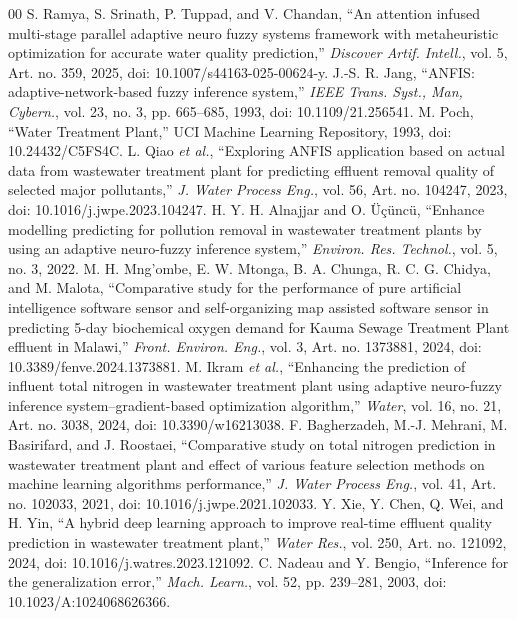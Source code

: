 \documentclass[conference]{IEEEtran}
\begin{document}
\begin{thebibliography}{00}
 S. Ramya, S. Srinath, P. Tuppad, and V. Chandan, ``An attention infused multi-stage parallel adaptive neuro fuzzy systems framework with metaheuristic optimization for accurate water quality prediction,'' \emph{Discover Artif. Intell.}, vol. 5, Art. no. 359, 2025, doi: 10.1007/s44163-025-00624-y.
 J.-S. R. Jang, ``ANFIS: adaptive-network-based fuzzy inference system,'' \emph{IEEE Trans. Syst., Man, Cybern.}, vol. 23, no. 3, pp. 665--685, 1993, doi: 10.1109/21.256541.
 M. Poch, ``Water Treatment Plant,'' UCI Machine Learning Repository, 1993, doi: 10.24432/C5FS4C.
 L. Qiao \emph{et al.}, ``Exploring ANFIS application based on actual data from wastewater treatment plant for predicting effluent removal quality of selected major pollutants,'' \emph{J. Water Process Eng.}, vol. 56, Art. no. 104247, 2023, doi: 10.1016/j.jwpe.2023.104247.
 H. Y. H. Alnajjar and O. \"U\c{c}\"unc\"u, ``Enhance modelling predicting for pollution removal in wastewater treatment plants by using an adaptive neuro-fuzzy inference system,'' \emph{Environ. Res. Technol.}, vol. 5, no. 3, 2022.
 M. H. Mng'ombe, E. W. Mtonga, B. A. Chunga, R. C. G. Chidya, and M. Malota, ``Comparative study for the performance of pure artificial intelligence software sensor and self-organizing map assisted software sensor in predicting 5-day biochemical oxygen demand for Kauma Sewage Treatment Plant effluent in Malawi,'' \emph{Front. Environ. Eng.}, vol. 3, Art. no. 1373881, 2024, doi: 10.3389/fenve.2024.1373881.
 M. Ikram \emph{et al.}, ``Enhancing the prediction of influent total nitrogen in wastewater treatment plant using adaptive neuro-fuzzy inference system--gradient-based optimization algorithm,'' \emph{Water}, vol. 16, no. 21, Art. no. 3038, 2024, doi: 10.3390/w16213038.
 F. Bagherzadeh, M.-J. Mehrani, M. Basirifard, and J. Roostaei, ``Comparative study on total nitrogen prediction in wastewater treatment plant and effect of various feature selection methods on machine learning algorithms performance,'' \emph{J. Water Process Eng.}, vol. 41, Art. no. 102033, 2021, doi: 10.1016/j.jwpe.2021.102033.
 Y. Xie, Y. Chen, Q. Wei, and H. Yin, ``A hybrid deep learning approach to improve real-time effluent quality prediction in wastewater treatment plant,'' \emph{Water Res.}, vol. 250, Art. no. 121092, 2024, doi: 10.1016/j.watres.2023.121092.
 C. Nadeau and Y. Bengio, ``Inference for the generalization error,'' \emph{Mach. Learn.}, vol. 52, pp. 239--281, 2003, doi: 10.1023/A:1024068626366.

\end{thebibliography}
\end{document}
